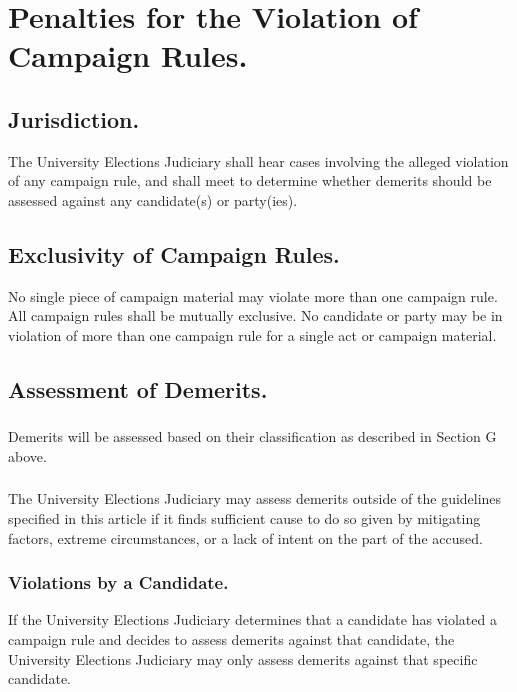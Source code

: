 \section{Penalties for the Violation of Campaign Rules.}
\subsection{Jurisdiction.}
The University Elections Judiciary shall hear cases involving the alleged violation of any campaign rule, and shall meet to determine whether demerits should be assessed against any candidate(s) or party(ies).
\subsection{Exclusivity of Campaign Rules.}
No single piece of campaign material may violate more than one campaign rule.  All campaign rules shall be mutually exclusive.  No candidate or party may be in violation of more than one campaign rule for a single act or campaign material.
\subsection{Assessment of Demerits.}
\subsubsection{}
Demerits will be assessed based on their classification as described in Section G above.
\subsubsection{}
The University Elections Judiciary may assess demerits outside of the guidelines specified in this article if it finds sufficient cause to do so given by mitigating factors, extreme circumstances, or a lack of intent on the part of the accused.
\subsubsection{Violations by a Candidate.}
If the University Elections Judiciary determines that a candidate has violated a campaign rule and decides to assess demerits against that candidate, the University Elections Judiciary may only assess demerits against that specific candidate.
